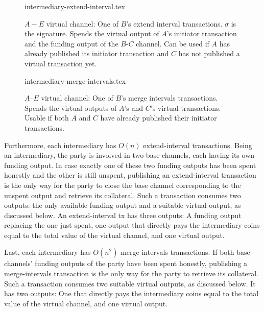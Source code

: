   \begin{figure}
    {intermediary-extend-interval.tex}
    \caption{$A-E$ virtual channel: One of $B$'s extend interval
    transactions. $\sigma$ is the signature. Spends the virtual output of $A$'s
    initiator transaction and the funding output of the $B$-$C$ channel. Can be
    used if $A$ has already published its initiator transaction and $C$ has not
    published a virtual transaction yet.}
    \label{figure:virtual-layer-extend-interval}
  \end{figure}

  \begin{figure}
    {intermediary-merge-intervals.tex}
    \caption{$A$--$E$ virtual channel: One of $B$'s merge intervals
    transactions. Spends the virtual outputs of $A$'s and $C$'s virtual
    transactions. Usable if both $A$ and $C$ have already published their
    initiator transactions.}
    \label{figure:virtual-layer-merge-intervals}
  \end{figure}

  Furthermore, each intermediary has $O(n)$ extend-interval transactions.
  Being an intermediary, the party is involved in two base channels, each having
  its own funding output. In case exactly one of these two funding outputs has
  been spent honestly and the other is still unspent,
  publishing an extend-interval transaction is the only way for the party to
  close the base channel corresponding to the unspent output and retrieve its
  collateral.
  Such a transaction consumes two outputs: the only
  available funding output and a suitable virtual output, as discussed below. An
  extend-interval tx has three outputs: A funding output replacing the one just
  spent, one output that directly pays the intermediary coins equal to the total
  value of the virtual channel, and one virtual output.

  Last, each intermediary has $O(n^2)$ merge-intervals transactions. If both
  base channels' funding outputs of the party have been spent honestly,
  publishing a merge-intervals
  transaction is the only way for the party to retrieve its collateral. Such a
  transaction consumes two suitable virtual outputs, as discussed below. It has
  two outputs: One that directly pays the intermediary coins equal to the total
  value of the virtual channel, and one virtual output.

